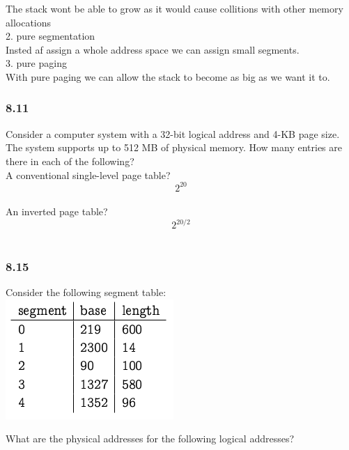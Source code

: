 \documentclass[a4paper,10pt,titlepage]{report}
\begin{document}
\hspace{15mm}  The stack wont be able to grow as it would cause collitions with other memory allocations \\


\hspace{10mm} 2. pure segmentation\\
\hspace{15mm} Insted af assign a whole address space we can assign small segments. \\

\hspace{10mm} 3. pure paging\\
\hspace{15mm} With pure paging we can allow the stack to become as big as we want it to. \\



\subsubsection{8.11}
Consider a computer system with a 32-bit logical address and 4-KB page size. The system supports up to 512 MB of physical memory. How many entries are there in each of the following?\\
\hspace{10mm}A conventional single-level page table?\\
\hspace{15mm}
\begin{equation}
2^{20} 
\end{equation}\\
\hspace{10mm}An inverted page table?
\hspace{15mm} \begin{equation}
2^{20/2}
\end{equation} \\





\subsubsection{8.15}
Consider the following segment table:\\
\includegraphics[scale=1]{ex-8-15.png}
\\
\begin{flushleft}

What are the physical addresses for the following logical addresses?
\end{flushleft}
\end{document}
